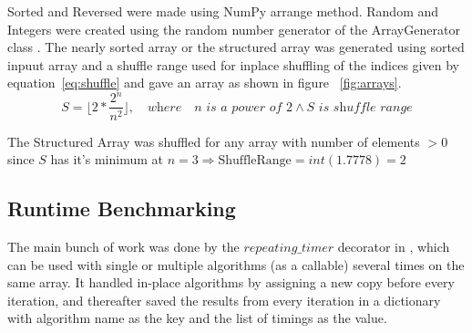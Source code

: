 \documentclass[sigconf, nonacm, natbib, screen, balance=False]{acmart}
\begin{document}
Sorted and Reversed were made using NumPy arrange method. Random and Integers were created using the random number generator of the ArrayGenerator class \cite{RandomGe86:online}. The nearly sorted array or the structured array was generated using sorted inpuut array and a shuffle range used for inplace shuffling of the indices given by equation~\ref{eq:shuffle} and gave an array as shown in figure ~\ref{fig:arrays}.
\begin{equation}
\label{eq:shuffle}
    S = \lfloor 2 *\frac{ 2^n }{n^2}\rfloor, \quad \textit{where} \quad n\textit{ is a power of 2} \land S\textit{ is shuffle range}
\end{equation}

%   

The Structured Array was shuffled for any array with number of elements $> 0$ since $S$ has it's minimum at $n = 3 \Rightarrow \text{ShuffleRange} = int(1.7778) = 2$

\subsection{Runtime Benchmarking}\label{sec:methbench}

The main bunch of work was done by the $repeating\_timer$ decorator in \texttt{}, which can be used with single or multiple algorithms (as a callable) several times on the same array. It handled in-place algorithms by assigning a new copy before every iteration, and thereafter saved the results from every iteration in a dictionary with algorithm name as the key and the list of timings as the value. 

\end{document}
